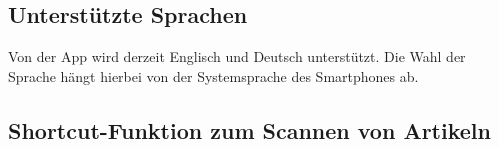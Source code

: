 \subsection{Unterstützte Sprachen} \label{subsec:languages}

Von der App wird derzeit Englisch und Deutsch unterstützt.
Die Wahl der Sprache hängt hierbei von der Systemsprache des Smartphones ab.

\subsection{Shortcut-Funktion zum Scannen von Artikeln} \label{subsec:scan-item-shortcut}

